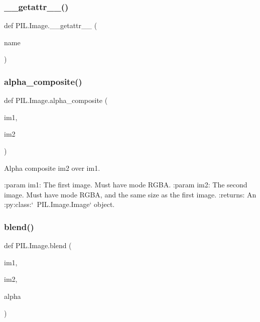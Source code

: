 \subsubsection{\texorpdfstring{\+\_\+\+\_\+getattr\+\_\+\+\_\+()}{\_\_getattr\_\_()}}
{\footnotesize\ttfamily def P\+I\+L.\+Image.\+\_\+\+\_\+getattr\+\_\+\+\_\+ (\begin{DoxyParamCaption}\item[{}]{name }\end{DoxyParamCaption})}

\mbox{\label{namespacePIL_1_1Image_aa30033bf03231aa454219a169521b5ca}} 
\subsubsection{\texorpdfstring{alpha\+\_\+composite()}{alpha\_composite()}}
{\footnotesize\ttfamily def P\+I\+L.\+Image.\+alpha\+\_\+composite (\begin{DoxyParamCaption}\item[{}]{im1,  }\item[{}]{im2 }\end{DoxyParamCaption})}

\begin{DoxyVerb}Alpha composite im2 over im1.

:param im1: The first image. Must have mode RGBA.
:param im2: The second image.  Must have mode RGBA, and the same size as
   the first image.
:returns: An :py:class:`~PIL.Image.Image` object.
\end{DoxyVerb}
 \mbox{\label{namespacePIL_1_1Image_a2aaf219b9db8c7c104f2447fc7b53556}} 
\subsubsection{\texorpdfstring{blend()}{blend()}}
{\footnotesize\ttfamily def P\+I\+L.\+Image.\+blend (\begin{DoxyParamCaption}\item[{}]{im1,  }\item[{}]{im2,  }\item[{}]{alpha }\end{DoxyParamCaption})}

